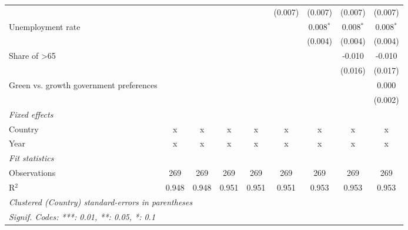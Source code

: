 \begin{table}[htbp]
\begin{tabular}{lcccccccc}
                                               &              &              &               &               & (0.007)      & (0.007)      & (0.007)     & (0.007)\\   
      Unemployment rate                        &              &              &               &               &              & 0.008$^{*}$  & 0.008$^{*}$ & 0.008$^{*}$\\   
                                               &              &              &               &               &              & (0.004)      & (0.004)     & (0.004)\\   
      Share of >65                             &              &              &               &               &              &              & -0.010      & -0.010\\   
                                               &              &              &               &               &              &              & (0.016)     & (0.017)\\   
      Green vs. growth government preferences  &              &              &               &               &              &              &             & 0.000\\   
                                               &              &              &               &               &              &              &             & (0.002)\\   
      \emph{Fixed effects}\\
      Country                                  & x            & x            & x             & x             & x            & x            & x           & x\\  
      Year                                     & x            & x            & x             & x             & x            & x            & x           & x\\  
      \midrule \emph{Fit statistics}\\
      Observations                             & 269          & 269          & 269           & 269           & 269          & 269          & 269         & 269\\  
      R$^2$                                    & 0.948        & 0.948        & 0.951         & 0.951         & 0.951        & 0.953        & 0.953       & 0.953\\  
      \midrule
      \multicolumn{9}{l}{\emph{Clustered (Country) standard-errors in parentheses}}\\
      \multicolumn{9}{l}{\emph{Signif. Codes: ***: 0.01, **: 0.05, *: 0.1}}\\
   \end{tabular}
\end{table}


